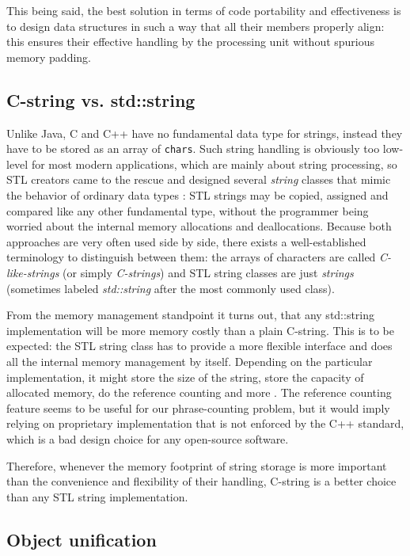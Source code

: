 This being said, the best solution in terms of code portability and effectiveness
is to design data structures in such a way that all their members properly align:
this ensures their effective handling by the processing unit without spurious memory padding.

\subsection{C-string vs. std::string}
\label{sec:strings}

Unlike Java, C and C++ have no fundamental data type for strings, instead they have
to be stored as an array of \texttt{chars}.
Such string handling is obviously too low-level for most modern applications,
which are mainly about string processing, so STL creators came to the rescue and designed
several \emph{string} classes that mimic the behavior of ordinary data types
\citep[Chapter 11]{josuttis:stl}:
STL strings may be copied, assigned and compared like any other fundamental type,
without the programmer being worried about the internal memory allocations and deallocations.
Because both approaches are very often used side by side, there exists a well-established
terminology to distinguish between them:
the arrays of characters are called \emph{C-like-strings} (or simply \emph{C-strings}) and
STL string classes are just \emph{strings} (sometimes labeled \emph{std::string} after the
most commonly used class).

From the memory management standpoint it turns out, that any std::string
implementation will be more memory costly than a plain C-string.
This is to be expected: the STL string class has to provide a more flexible interface
and does all the internal memory management by itself.
Depending on the particular implementation, it might store the size of the string,
store the capacity of allocated memory, do the reference counting and more
\citep[Item 15]{meyers:effectivestl}.
The reference counting feature seems to be useful for our phrase-counting problem,
but it would imply relying on proprietary implementation that is not enforced by
the C++ standard, which is a bad design choice for any open-source software.

Therefore, whenever the memory footprint of string storage is more important than
the convenience and flexibility of their handling, C-string is a better choice
than any STL string implementation.

\subsection{Object unification}
\label{sec:object-unification}

